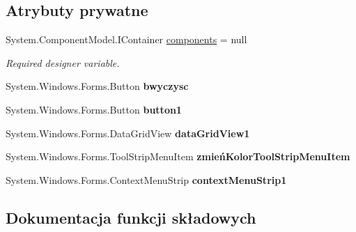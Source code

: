\subsection*{Atrybuty prywatne}
\begin{DoxyCompactItemize}
\item 
System.\+Component\+Model.\+I\+Container \mbox{\hyperlink{class_proj__przegladarka_1_1_historia_a1ac23c4e73ab59069446cdb8eefdfec2}{components}} = null
\begin{DoxyCompactList}\small\item\em Required designer variable. \end{DoxyCompactList}\item 
\mbox{\label{class_proj__przegladarka_1_1_historia_a131dd48b36bd24b4e95cc00912029233}} 
System.\+Windows.\+Forms.\+Button {\bfseries bwyczysc}
\item 
\mbox{\label{class_proj__przegladarka_1_1_historia_abe1e01723c12546c30282c3451b0a617}} 
System.\+Windows.\+Forms.\+Button {\bfseries button1}
\item 
\mbox{\label{class_proj__przegladarka_1_1_historia_a8114acb364338a26a1b31756e8eba3ac}} 
System.\+Windows.\+Forms.\+Data\+Grid\+View {\bfseries data\+Grid\+View1}
\item 
\mbox{\label{class_proj__przegladarka_1_1_historia_ad40765b4b1d8739c42a96281ec6fdc2f}} 
System.\+Windows.\+Forms.\+Tool\+Strip\+Menu\+Item {\bfseries zmień\+Kolor\+Tool\+Strip\+Menu\+Item}
\item 
\mbox{\label{class_proj__przegladarka_1_1_historia_aa91d0c9b29f88cc84c1f69b267763ac5}} 
System.\+Windows.\+Forms.\+Context\+Menu\+Strip {\bfseries context\+Menu\+Strip1}
\end{DoxyCompactItemize}


\subsection{Dokumentacja funkcji składowych}
\mbox{\label{class_proj__przegladarka_1_1_historia_a2c916ccfcdca60b63bf27b0163025db0}} 
